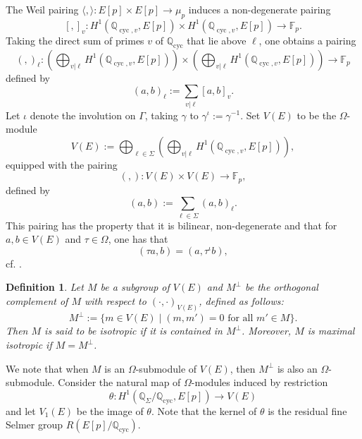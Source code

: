 \documentclass[12pt]{amsart}
\newtheorem{definition}[theorem]{Definition}
\newcommand{\Q}{\mathbb{Q}}
\newcommand{\F}{\mathbb{F}}
\newcommand{\op}[1]{\operatorname{#1}}
\numberwithin{equation}{section}
\begin{document}
The Weil pairing $\langle,\rangle: E[p]\times E[p]\rightarrow \mu_p$ induces a non-degenerate pairing 
\[[,]_v: H^1(\Q_{\op{cyc}, v}, E[p])\times H^1(\Q_{\op{cyc}, v}, E[p])\rightarrow \F_p.\] Taking the direct sum of primes $v$ of $\Q_{\op{cyc}}$ that lie above $\ell$, one obtains a pairing 
\[(,)_\ell: \left(\bigoplus_{v|\ell} H^1(\Q_{\op{cyc}, v}, E[p])\right)\times \left(\bigoplus_{v|\ell} H^1(\Q_{\op{cyc}, v}, E[p])\right)\rightarrow \F_p\]
defined by 
\[(a,b)_\ell:=\sum_{v|\ell} [a,b]_v.\]
Let $\iota$ denote the involution on $\Gamma$, taking $\gamma$ to $\gamma^{\iota}:=\gamma^{-1}$. Set $V(E)$ to be the $\Omega$-module 
\begin{equation}\label{defn of V(E)}V(E):=\bigoplus_{\ell\in \Sigma} \left(\bigoplus_{v|\ell} H^1(\Q_{\op{cyc}, v}, E[p]) \right),\end{equation}
equipped with the pairing 
\[(,): V(E)\times V(E) \rightarrow \F_p,\] defined by 
\[(a,b):=\sum_{\ell\in \Sigma} (a,b)_\ell.\] This pairing has the property that it is bilinear, non-degenerate and that for $a,b\in V(E)$ and $\tau\in \Omega$, one has that 
\begin{equation}(\tau a, b)=(a, \tau^\iota b),\end{equation} cf. \cite[Proposition 1.5.3]{NSW}.

\begin{definition}
    Let $M$ be a subgroup of $V(E)$ and $M^{\perp}$ be the orthogonal complement of $M$ with respect to $(\cdot, \cdot)_{V(E)}$, defined as follows:
    \[M^{\perp}:=\{m\in V(E)\mid (m, m')=0\text{ for all }m'\in M\}.\]
    Then $M$ is said to be \emph{isotropic} if it is contained in $M^{\perp}$. Moreover, $M$ is \emph{maximal isotropic} if $M=M^{\perp}$.
\end{definition}
We note that when $M$ is an $\Omega$-submodule of $V(E)$, then $M^{\perp}$ is also an $\Omega$-submodule. Consider the natural map of $\Omega$-modules induced by restriction
\[\theta: H^1(\Q_\Sigma/\Q_{\op{cyc}}, E[p])\rightarrow V(E)\] and let $V_1(E)$ be the image of $\theta$. Note that the kernel of $\theta$ is the residual fine Selmer group $R(E[p]/\Q_{\op{cyc}})$. 
\end{document}

